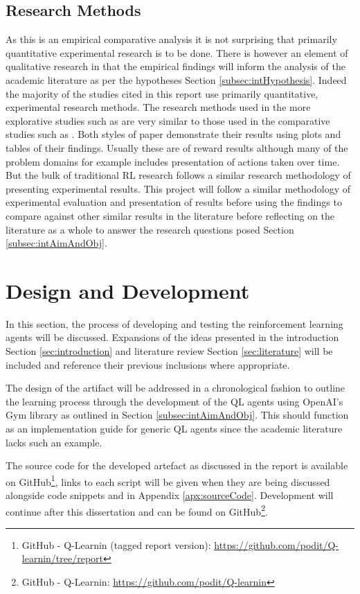 \documentclass[hidelinks,journal]{IEEEtran}
\begin{document}
\subsection{Research Methods}
\label{subsec:mthdRes}
As this is an empirical comparative analysis it is not surprising that primarily quantitative experimental research is to be done. There is however an element of qualitative research in that the empirical findings will inform the analysis of the academic literature as per the hypotheses Section \ref{subsec:intHypothesis}. Indeed the majority of the studies cited in this report use primarily quantitative, experimental research methods. The research methods used in the more explorative studies such as \textcite{Wang13, Waldock08} are very similar to those used in the comparative studies such as \textcite{Corozza15, Nagendra18, Seijen09}. Both styles of paper demonstrate their results using plots and tables of their findings. Usually these are of reward results although many of the problem domains for example \textcite{Corozza15} includes presentation of actions taken over time. But the bulk of traditional RL research follows a similar research methodology of presenting experimental results. This project will follow a similar methodology of experimental evaluation and presentation of results before using the findings to compare against other similar results in the literature before reflecting on the literature as a whole to answer the research questions posed Section \ref{subsec:intAimAndObj}.
\section{Design and Development}
\label{sec:design}
In this section, the process of developing and testing the reinforcement learning agents will be discussed. Expansions of the ideas presented in the introduction Section \ref{sec:introduction} and literature review Section \ref{sec:literature} will be included and reference their previous inclusions where appropriate.

The design of the artifact will be addressed in a chronological fashion to outline the learning process through the development of the QL agents using OpenAI’s Gym library as outlined in Section \ref{subsec:intAimAndObj}. This should function as an implementation guide for generic QL agents since the academic literature lacks such an example.

The source code for the developed artefact as discussed in the report is available on GitHub\footnote{GitHub - Q-Learnin (tagged report version): \url{https://github.com/podit/Q-learnin/tree/report}}, links to each script will be given when they are being discussed alongside code snippets and in Appendix \ref{apx:sourceCode}. Development will continue after this dissertation and can be found on GitHub\footnote{GitHub - Q-Learnin: \url{https://github.com/podit/Q-learnin}}.
\end{document}
